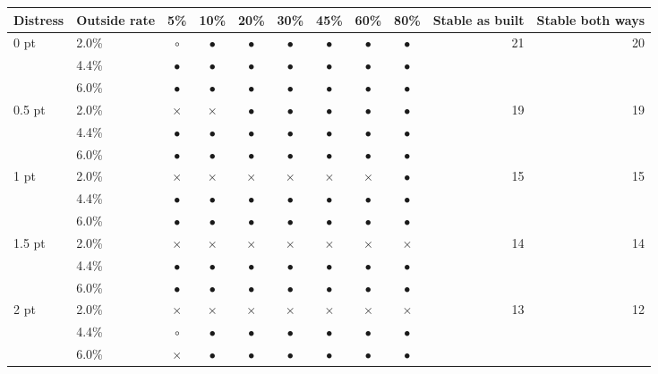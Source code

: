 \begin{tabular}{llcccccccrr}
\toprule
Distress & Outside rate & 5\% & 10\% & 20\% & 30\% & 45\% & 60\% & 80\% & Stable as built & Stable both ways \\
\midrule
0 pt & 2.0\% & $\circ$ & $\bullet$ & $\bullet$ & $\bullet$ & $\bullet$ & $\bullet$ & $\bullet$ & 21 & 20 \\
 & 4.4\% & $\bullet$ & $\bullet$ & $\bullet$ & $\bullet$ & $\bullet$ & $\bullet$ & $\bullet$ &  &  \\
 & 6.0\% & $\bullet$ & $\bullet$ & $\bullet$ & $\bullet$ & $\bullet$ & $\bullet$ & $\bullet$ &  &  \\
0.5 pt & 2.0\% & $\times$ & $\times$ & $\bullet$ & $\bullet$ & $\bullet$ & $\bullet$ & $\bullet$ & 19 & 19 \\
 & 4.4\% & $\bullet$ & $\bullet$ & $\bullet$ & $\bullet$ & $\bullet$ & $\bullet$ & $\bullet$ &  &  \\
 & 6.0\% & $\bullet$ & $\bullet$ & $\bullet$ & $\bullet$ & $\bullet$ & $\bullet$ & $\bullet$ &  &  \\
1 pt & 2.0\% & $\times$ & $\times$ & $\times$ & $\times$ & $\times$ & $\times$ & $\bullet$ & 15 & 15 \\
 & 4.4\% & $\bullet$ & $\bullet$ & $\bullet$ & $\bullet$ & $\bullet$ & $\bullet$ & $\bullet$ &  &  \\
 & 6.0\% & $\bullet$ & $\bullet$ & $\bullet$ & $\bullet$ & $\bullet$ & $\bullet$ & $\bullet$ &  &  \\
1.5 pt & 2.0\% & $\times$ & $\times$ & $\times$ & $\times$ & $\times$ & $\times$ & $\times$ & 14 & 14 \\
 & 4.4\% & $\bullet$ & $\bullet$ & $\bullet$ & $\bullet$ & $\bullet$ & $\bullet$ & $\bullet$ &  &  \\
 & 6.0\% & $\bullet$ & $\bullet$ & $\bullet$ & $\bullet$ & $\bullet$ & $\bullet$ & $\bullet$ &  &  \\
2 pt & 2.0\% & $\times$ & $\times$ & $\times$ & $\times$ & $\times$ & $\times$ & $\times$ & 13 & 12 \\
 & 4.4\% & $\circ$ & $\bullet$ & $\bullet$ & $\bullet$ & $\bullet$ & $\bullet$ & $\bullet$ &  &  \\
 & 6.0\% & $\times$ & $\bullet$ & $\bullet$ & $\bullet$ & $\bullet$ & $\bullet$ & $\bullet$ &  &  \\
\bottomrule
\end{tabular}
